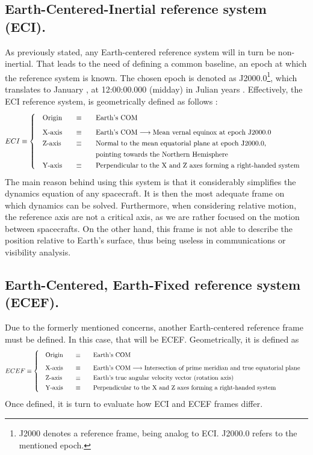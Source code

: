 	\subsection{Earth-Centered-Inertial reference system (ECI).}
	\indent As previously stated, any Earth-centered reference system will in turn be non-inertial. That leads to the need of defining a common baseline, \ie an epoch at which the reference system is known. The chosen epoch is denoted as J2000.0\footnote{J2000 denotes a reference frame, being analog to ECI. J2000.0 refers to the mentioned epoch.}, which translates to January , at 12:00:00.000 (midday) in Julian years \cite[see][, glossary]{Time_handbook}. Effectively, the ECI reference system, is geometrically defined as follows \cite{Tapley}:
	\[
	\arraycolsep=10pt
	\def\arraystretch{1.3}
	ECI \equiv\left\{
	\begin{array}{lll}
	\text{Origin} 	& \equiv 	& \text{Earth's COM} \\[0.5 em]
	\text{X-axis} 	& \equiv 	& \text{Earth's COM} \longrightarrow \text{Mean vernal equinox at epoch J2000.0} \\
	\text{Z-axis} 	& \equiv 	& \text{Normal to the mean equatorial plane at epoch J2000.0, } \\
	  				& 			& \text{pointing towards the Northern Hemisphere} \\
	\text{Y-axis} 	& \equiv 	& \text{Perpendicular to the X and Z axes forming a right-handed system} \\
	\end{array}
	\right.
	\]
	\indent The main reason behind using this system is that it considerably simplifies the dynamics equation of any spacecraft. It is then the most adequate frame on which dynamics can be solved. Furthermore, when considering relative motion, the reference axis are not a critical axis, as we are rather focused on the motion between spacecrafts. On the other hand, this frame is not able to describe the position relative to Earth's surface, thus being useless in communications or visibility analysis.
	\subsection{Earth-Centered, Earth-Fixed reference system (ECEF).}
	\indent Due to the formerly mentioned concerns, another Earth-centered reference frame must be defined. In this case, that will be ECEF. Geometrically, it is defined as \cite{Tapley}
	\[
	\arraycolsep=10pt
	\def\arraystretch{1.3}
	ECEF \equiv\left\{
	\begin{array}{lll}
	\text{Origin} 	& \equiv 	& \text{Earth's COM} \\[0.5 em]
	\text{X-axis} 	& \equiv 	& \text{Earth's COM} \longrightarrow \text{Intersection of prime meridian and true equatorial plane} \\
	\text{Z-axis} 	& \equiv 	& \text{Earth's true angular velocity vector (rotation axis)} \\
	\text{Y-axis} 	& \equiv 	& \text{Perpendicular to the X and Z axes forming a right-handed system} \\
	\end{array}
	\right.
	\]
	\indent Once defined, it is turn to evaluate how ECI and ECEF frames differ.
